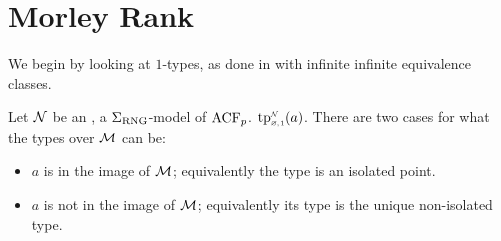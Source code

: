 \section{Morley Rank}

We begin by looking at $1$-types, 
as done in  
with infinite infinite equivalence classes.

\begin{prop}
    Let $\mathcal{N}$ be an , 
    a $\Sigma_{\mathrm{RNG}}$-model of $\operatorname{ACF}_p$.
        $\subintp{\nothing,1}{\NN}{\tp}(a)$.
    There are two cases for what the types over $\mathcal{M}$ can be:
    \begin{itemize}
        \item $a$ is in the image of $\mathcal{M}$; 
            equivalently the type is an isolated point.
        \item $a$ is not in the image of $\mathcal{M}$;
            equivalently its type is the unique non-isolated type.
    \end{itemize}
\end{prop}
